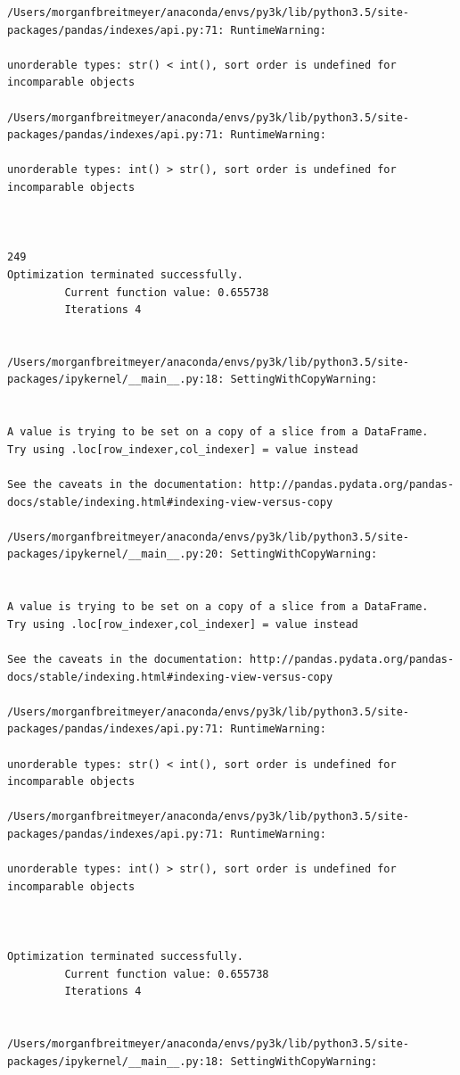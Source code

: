 \begin{lstlisting}
/Users/morganfbreitmeyer/anaconda/envs/py3k/lib/python3.5/site-packages/pandas/indexes/api.py:71: RuntimeWarning:

unorderable types: str() < int(), sort order is undefined for incomparable objects

/Users/morganfbreitmeyer/anaconda/envs/py3k/lib/python3.5/site-packages/pandas/indexes/api.py:71: RuntimeWarning:

unorderable types: int() > str(), sort order is undefined for incomparable objects



249
Optimization terminated successfully.
         Current function value: 0.655738
         Iterations 4


/Users/morganfbreitmeyer/anaconda/envs/py3k/lib/python3.5/site-packages/ipykernel/__main__.py:18: SettingWithCopyWarning:


A value is trying to be set on a copy of a slice from a DataFrame.
Try using .loc[row_indexer,col_indexer] = value instead

See the caveats in the documentation: http://pandas.pydata.org/pandas-docs/stable/indexing.html#indexing-view-versus-copy

/Users/morganfbreitmeyer/anaconda/envs/py3k/lib/python3.5/site-packages/ipykernel/__main__.py:20: SettingWithCopyWarning:


A value is trying to be set on a copy of a slice from a DataFrame.
Try using .loc[row_indexer,col_indexer] = value instead

See the caveats in the documentation: http://pandas.pydata.org/pandas-docs/stable/indexing.html#indexing-view-versus-copy

/Users/morganfbreitmeyer/anaconda/envs/py3k/lib/python3.5/site-packages/pandas/indexes/api.py:71: RuntimeWarning:

unorderable types: str() < int(), sort order is undefined for incomparable objects

/Users/morganfbreitmeyer/anaconda/envs/py3k/lib/python3.5/site-packages/pandas/indexes/api.py:71: RuntimeWarning:

unorderable types: int() > str(), sort order is undefined for incomparable objects



Optimization terminated successfully.
         Current function value: 0.655738
         Iterations 4


/Users/morganfbreitmeyer/anaconda/envs/py3k/lib/python3.5/site-packages/ipykernel/__main__.py:18: SettingWithCopyWarning:



\end{lstlisting}
